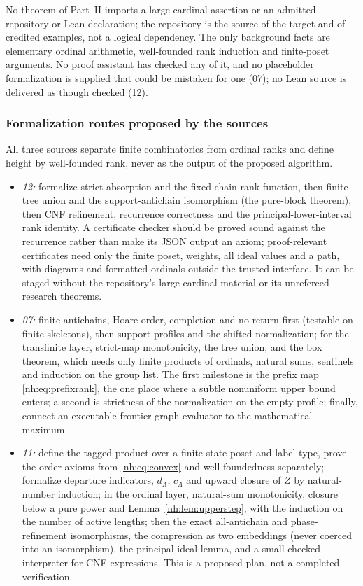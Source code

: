 \documentclass[11pt,a4paper]{article}
\theoremstyle{definition}
\theoremstyle{remark}
\begin{document}
No theorem of Part~II imports a large-cardinal assertion or an admitted
repository or Lean declaration; the repository is the source of the target and of
credited examples, not a logical dependency. The only background facts are
elementary ordinal arithmetic, well-founded rank induction and finite-poset
arguments. No proof assistant has checked any of it, and no placeholder
formalization is supplied that could be mistaken for one (07); no Lean source is
delivered as though checked (12).

\subsubsection{Formalization routes proposed by the sources}

All three sources separate finite combinatorics from ordinal ranks and define
height by well-founded rank, never as the output of the proposed algorithm.
\begin{itemize}
\item \emph{12:} formalize strict absorption and the fixed-chain rank function,
then finite tree union and the support-antichain isomorphism (the pure-block
theorem), then CNF refinement, recurrence correctness and the
principal-lower-interval rank identity. A certificate checker should be proved
sound against the recurrence rather than make its JSON output an axiom;
proof-relevant certificates need only the finite poset, weights, all ideal values
and a path, with diagrams and formatted ordinals outside the trusted interface.
It can be staged without the repository's large-cardinal material or its
unrefereed research theorems.
\item \emph{07:} finite antichains, Hoare order, completion and no-return first
(testable on finite skeletons), then support profiles and the shifted
normalization; for the transfinite layer, strict-map monotonicity, the tree
union, and the box theorem, which needs only finite products of ordinals,
natural sums, sentinels and induction on the group list. The first milestone is
the prefix map \eqref{nh:eq:prefixrank}, the one place where a subtle nonuniform
upper bound enters; a second is strictness of the normalization on the empty
profile; finally, connect an executable frontier-graph evaluator to the
mathematical maximum.
\item \emph{11:} define the tagged product over a finite state poset and label
type, prove the order axioms from \eqref{nh:eq:convex} and well-foundedness
separately; formalize departure indicators, $d_\Lambda$, $c_\Lambda$ and upward
closure of $Z$ by natural-number induction; in the ordinal layer, natural-sum
monotonicity, closure below a pure power and Lemma~\ref{nh:lem:upperstep}, with
the induction on the number of active lengths; then the exact all-antichain and
phase-refinement isomorphisms, the compression as two embeddings (never coerced
into an isomorphism), the principal-ideal lemma, and a small checked interpreter
for CNF expressions. This is a proposed plan, not a completed verification.
\end{itemize}
\end{document}
